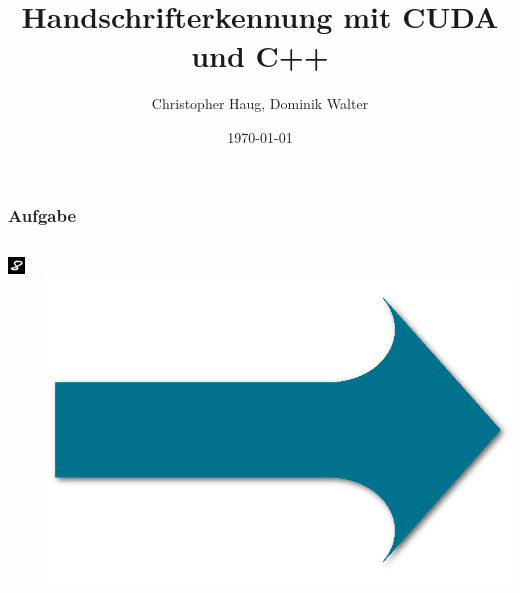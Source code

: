 \documentclass[xcolor=pdftex,dvipsnames,table]{beamer}
\title{Handschrifterkennung mit CUDA und C++}
\author{Christopher Haug, Dominik Walter}
\institute[Uni Augsburg]{University of Augsburg\\Systems and Networking}
\date[]{\today}
\begin{document}
	\frame{\titlepage}
	\begin{frame}
		\frametitle{Aufgabe}
		\begin{columns}
			\begin{column}{0.25\textwidth}
				\includegraphics[width=1\textwidth]{sample.png}
			\end{column}
			\begin{column}{0.05\textwidth}
				\\
				\includegraphics[width=1\textwidth]{arrow.png}\\

\end{column}
\end{columns}
\end{frame}
\end{document}
